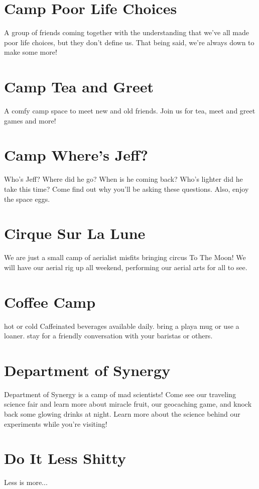 \section*{Camp Poor Life Choices}
A group of friends coming together with the understanding that we've all made poor life choices, but they don't define us. That being said, we're always down to make some more! 


\section*{Camp Tea and Greet}
A comfy camp space to meet new and old friends. Join us for tea, meet and greet games and more! 


\section*{Camp Where's Jeff?}
Who's Jeff? Where did he go? When is he coming back? Who's lighter did he take this time? Come find out why you'll be asking these questions. Also, enjoy the space eggs. 


\section*{Cirque Sur La Lune}
We are just a small camp of aerialist misfits bringing circus To The Moon! We will have our aerial rig up all weekend, performing our aerial arts for all to see. 


\section*{Coffee Camp}
hot or cold Caffeinated beverages available daily. bring a playa mug or use a loaner. stay for a friendly conversation with your baristas or others. 


\section*{Department of Synergy}
Department of Synergy is a camp of mad scientists! Come see our traveling science fair and learn more about miracle fruit, our geocaching game, and knock back some glowing drinks at night. Learn more about the science behind our experiments while you're visiting! 


\section*{Do It Less Shitty}
Less is more... 


